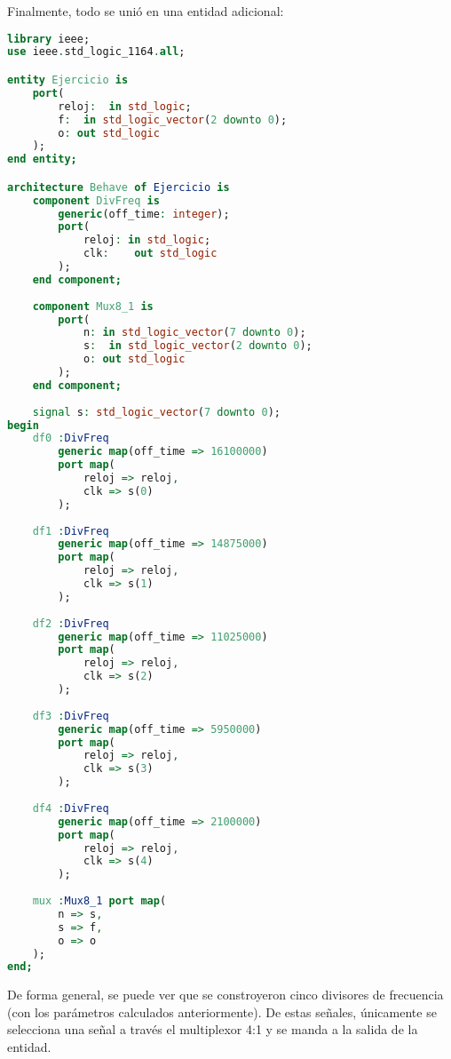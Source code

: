 \documentclass[../procedimientos.tex]{subfiles}
\begin{document}
Finalmente, todo se unió en una entidad adicional:
\begin{lstlisting}[language=vhdl]
library ieee;
use ieee.std_logic_1164.all;

entity Ejercicio is
	port(
		reloj:	in std_logic;
		f:	in std_logic_vector(2 downto 0);
		o: out std_logic
	);
end entity;

architecture Behave of Ejercicio is
	component DivFreq is
		generic(off_time: integer);
		port(
			reloj: in std_logic;
			clk:	out std_logic
		);
	end component;
	
	component Mux8_1 is
		port(
			n: in std_logic_vector(7 downto 0);
			s:	in std_logic_vector(2 downto 0);
			o: out std_logic
		);
	end component;
	
	signal s: std_logic_vector(7 downto 0);
begin
	df0 :DivFreq
		generic map(off_time => 16100000)
		port map(
			reloj => reloj,
			clk => s(0)
		);
	
	df1 :DivFreq
		generic map(off_time => 14875000)
		port map(
			reloj => reloj,
			clk => s(1)
		);
	
	df2 :DivFreq
		generic map(off_time => 11025000)
		port map(
			reloj => reloj,
			clk => s(2)
		);
	
	df3 :DivFreq
		generic map(off_time => 5950000)
		port map(
			reloj => reloj,
			clk => s(3)
		);
	
	df4 :DivFreq
		generic map(off_time => 2100000)
		port map(
			reloj => reloj,
			clk => s(4)
		);
	
	mux :Mux8_1 port map(
		n => s,
		s => f,
		o => o
	);
end;
\end{lstlisting}

De forma general, se puede ver que se constroyeron cinco divisores de 
frecuencia (con los parámetros calculados anteriormente). De estas señales, 
únicamente se selecciona una señal a través el multiplexor 4:1 y se manda a la 
salida de la entidad.
\end{document}
